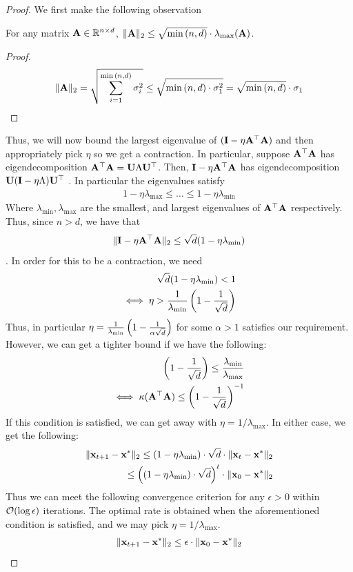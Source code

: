 \begin{proof}
We first make the following observation
\begin{lemma}
    For any matrix $\mathbf{A} \in \mathbb{R}^{n \times d}$, $\lVert \mathbf{A} \rVert_2 \leq \sqrt{\min{(n, d)}} \cdot \lambda_{\max}(\mathbf{A})$.
\end{lemma}
\begin{proof}
    \begin{align*}
        \lVert \mathbf{A} \rVert_2 = \sqrt{\sum_{i=1}^{\min{(n,d)}} \sigma_i^2} \leq \sqrt{\min{(n,d)} \cdot \sigma_1^2} = \sqrt{\min{(n,d)}} \cdot \sigma_1
    \end{align*}
\end{proof}
Thus, we will now bound the largest eigenvalue of $(\mathbf{I} - \eta \mathbf{A}^\top\mathbf{A})$ and then appropriately pick $\eta$ so we get a contraction. In particular, suppose $\mathbf{A}^\top \mathbf{A}$ has eigendecomposition $\mathbf{A}^\top\mathbf{A} = {\bf U} \Lambda {\bf U}^\top$. Then, $\mathbf{I} - \eta\mathbf{A}^\top\mathbf{A}$ has eigendecomposition ${\bf U} (\mathbf{I} - \eta\Lambda) {\bf U}^\top$ . In particular the eigenvalues satisfy
\begin{align*}
    1 - \eta\lambda_{\max} \leq \dots \leq 1 - \eta\lambda_{\min}
\end{align*}
Where $\lambda_{\min}, \lambda_{\max}$ are the smallest, and largest eigenvalues of $\mathbf{A}^\top\mathbf{A}$ respectively. Thus, since $n > d$, we have that $$\lVert \mathbf{I} - \eta \mathbf{A}^\top\mathbf{A} \rVert_2 \leq \sqrt{d}(1 - \eta \lambda_{\min})$$. In order for this to be a contraction, we need
\begin{align*}
    \sqrt{d}(1 - \eta\lambda_{\min}) < 1 \\
    \iff \eta > \frac{1}{\lambda_{\min}}\left( 1 - \frac{1}{\sqrt{d}}\right) 
\end{align*}
Thus, in particular $\eta = \frac{1}{\lambda_{\min}}\left( 1 - \frac{1}{\alpha\sqrt{d}} \right)$ for some $\alpha > 1$ satisfies our requirement. However, we can get a tighter bound if we have the following:
\begin{align*}
    \left( 1 - \frac{1}{\sqrt{d}} \right) \leq \frac{\lambda_{\min}}{\lambda_{\max}} \\
    \iff \kappa(\mathbf{A}^\top \mathbf{A}) \leq \left( 1 - \frac{1}{\sqrt{d}} \right)^{-1}
\end{align*}
If this condition is satisfied, we can get away with $\eta = 1/\lambda_{\max}$. In either case, we get the following:
\begin{align*}
    \lVert \mathbf{x}_{t+1} - \mathbf{x}^* \rVert_2 \leq \left(1 - \eta \lambda_{\min} \right) \cdot \sqrt{d} \cdot \lVert \mathbf{x}_t - \mathbf{x}^* \rVert_2 \\
    \leq \left( \left(1 - \eta \lambda_{\min} \right) \cdot \sqrt{d}\right)^t \cdot \lVert \mathbf{x}_0 - \mathbf{x}^* \rVert_2
\end{align*}
Thus we can meet the following convergence criterion for any $\epsilon > 0$ within $\mathcal{O}(\log \epsilon)$ iterations. The optimal rate is obtained when the aforementioned condition is satisfied, and we may pick $\eta = 1/\lambda_{\max}$.
\begin{align*}
    \lVert \mathbf{x}_{t + 1} - \mathbf{x}^* \rVert_2 \leq \epsilon \cdot \lVert \mathbf{x}_0 - \mathbf{x}^* \rVert_2
\end{align*}

    \end{proof}
